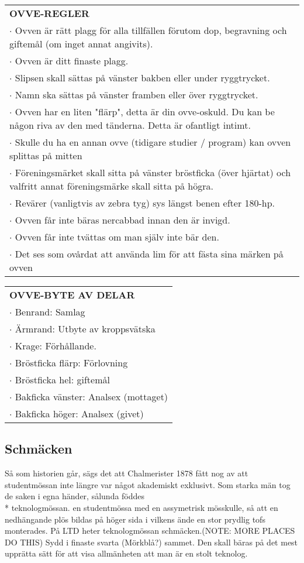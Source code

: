 \begin{tabular}{p{\textwidth}}
    \textbf{OVVE-REGLER}\\
    $\cdot$ Ovven är rätt plagg för alla tillfällen förutom dop, begravning och giftemål (om inget annat angivits).\\
    $\cdot$ Ovven är ditt finaste plagg.\\
    $\cdot$ Slipsen skall sättas på vänster bakben eller under ryggtrycket.\\
    $\cdot$ Namn ska sättas på vänster framben eller över ryggtrycket.\\
    $\cdot$ Ovven har en liten "flärp", detta är din ovve-oskuld. Du kan be någon riva av den med tänderna. Detta är ofantligt intimt.\\
    $\cdot$ Skulle du ha en annan ovve (tidigare studier / program) kan ovven splittas på mitten\\
    $\cdot$ Föreningsmärket skall sitta på vänster bröstficka (över hjärtat) och valfritt annat föreningsmärke skall sitta på högra.\\
    $\cdot$ Revärer (vanligtvis av zebra tyg) sys längst benen efter 180-hp.\\
    $\cdot$ Ovven får inte bäras nercabbad innan den är invigd.\\
    $\cdot$ Ovven får inte tvättas om man själv inte bär den.\\
    $\cdot$ Det ses som ovårdat att använda lim för att fästa sina märken på ovven\\
\end{tabular}
\begin{tabular}{p{\textwidth}}
    \textbf{OVVE-BYTE AV DELAR} \\
    $\cdot$ Benrand: Samlag\\
    $\cdot$ Ärmrand: Utbyte av kroppsvätska\\
    $\cdot$ Krage: Förhållande.\\
    $\cdot$ Bröstficka flärp: Förlovning \\
    $\cdot$ Bröstficka hel: giftemål\\
    $\cdot$ Bakficka vänster: Analsex (mottaget)\\
    $\cdot$ Bakficka höger: Analsex (givet)\\
\end{tabular}

\subsection*{\textbf{Schmäcken}}
Så som historien går, sägs det att Chalmerister 1878 fått nog av att studentmössan inte  längre var något akademiskt exklusivt.
Som starka män tog de saken i egna händer, sålunda föddes\\* teknologmössan. en studentmössa med en assymetrisk mösskulle, så att
en nedhängande plös bildas på höger sida i vilkens ände en stor prydlig tofs monterades. På LTD heter teknologmössan schmäcken.(NOTE: MORE PLACES DO THIS) Sydd i finaste svarta (Mörkblå?) sammet.
Den skall bäras på det mest upprätta sätt för att visa allmänheten att man är en stolt teknolog.

